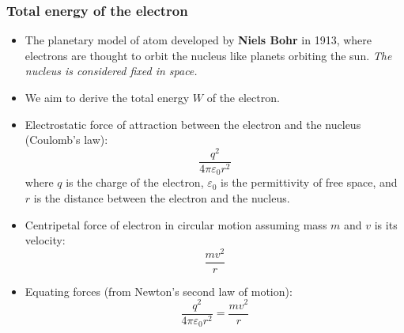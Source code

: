 \begin{frame}
	\frametitle{Total energy of the electron}
    \begin{itemize}
        \item The planetary model of atom developed by \textbf{Niels Bohr} in 1913, where electrons are thought to orbit the nucleus like planets orbiting the sun. \textit{The nucleus is considered fixed in space.}
        \item We aim to derive the total energy $W$ of the electron.
        \item Electrostatic force of attraction between the electron and the nucleus (Coulomb's law):
        \begin{equation}
            \frac{q^2}{4 \pi \varepsilon_0 r^2}
        \end{equation}  where $q$ is the charge of the electron, $\varepsilon_0$ is the permittivity of free space, and $r$ is the distance between the electron and the nucleus.
        \item Centripetal force of electron in circular motion assuming mass $m$ and $v$ is its velocity:
        \begin{equation}
            \frac{mv^2}{r}
        \end{equation}
        \item Equating forces (from Newton's second law of motion):
        \begin{equation} \label{eq:Newton}
            \frac{q^2}{4 \pi \varepsilon_0 r^2} = \frac{mv^2}{r}
        \end{equation}
    \end{itemize}
\end{frame}

